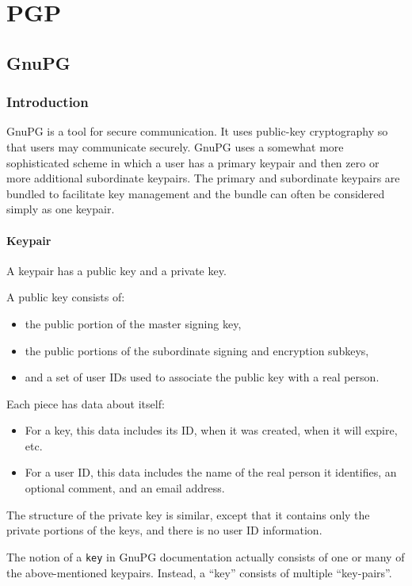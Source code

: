 \chapter{PGP}

\section{GnuPG}
\subsection{Introduction}
GnuPG is a tool for secure communication. It uses public-key cryptography so
that users may communicate securely. GnuPG uses a somewhat more sophisticated
scheme in which a user has a primary keypair and then zero or more additional
subordinate keypairs. The primary and subordinate keypairs are bundled to
facilitate key management and the bundle can often be considered simply as one
keypair.

\subsubsection{Keypair}
A keypair has a public key and a private key. 

A public key consists of: 
\begin{itemize}
        \item the public portion of the master signing key, 
        \item the public portions of the subordinate signing and encryption
            subkeys,
        \item and a set of user IDs used to associate the public key with a real person. 
\end{itemize}

Each piece has data about itself:
\begin{itemize}
    \item For a key, this data includes its ID, when it was created, when it will expire, etc. 
    \item For a user ID, this data includes the name of the real person it identifies, an optional comment, and an email address. 
\end{itemize}

The structure of the private key is similar, except that it contains only the
private portions of the keys, and there is no user ID information.


The notion of a \verb+key+ in GnuPG documentation actually consists of one or many of the above-mentioned keypairs.  Instead, a “key” consists of multiple “key-pairs”. 

